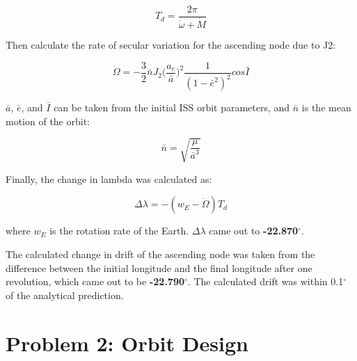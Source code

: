 \documentclass[conf]{new-aiaa}
\begin{document}





\begin{equation}
	T_d = \frac{2 \pi}{\dot{\omega} + \dot{M}}
\end{equation}

Then calculate the rate of secular variation for the ascending node due to J2: 

\begin{equation}
	\dot{\Omega} = - \frac{3}{2} \bar{n} J_2 \big( \frac{a_e}{ \bar{a} } \big) ^2 \frac{1}{(1-\bar{e}^2)^2} cos \bar{I}
	\label{eq:Odot}
\end{equation}

$\bar{a}$, $\bar{e}$, and $\bar{I}$ can be taken from the initial ISS orbit parameters, and $\bar{n}$ is the mean motion of the orbit: 

\begin{equation}
	\bar{n} = \sqrt{\frac{\mu}{\bar{a}^3}}
\end{equation}

Finally, the change in lambda was calculated as: 

\begin{equation}
	\Delta \lambda = -(w_E - \dot{\Omega}) T_d 
	\label{eq:dlambda}
\end{equation}

where $w_E$ is the rotation rate of the Earth. $\Delta \lambda$ came out to \textbf{-22.870$^\circ$}. 

The calculated change in drift of the ascending node was taken from the difference between the initial longitude and the final longitude after one revolution, which came out to be \textbf{-22.790$^\circ$}. The calculated drift was within 0.1$^\circ$ of the analytical prediction.  



\section*{Problem 2: Orbit Design}
\end{document}
